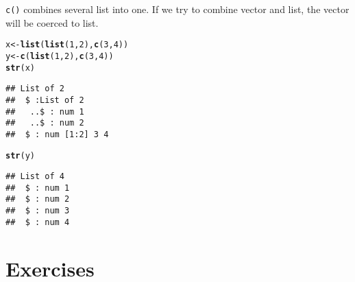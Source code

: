 \documentclass{article}\usepackage[]{graphicx}\usepackage[]{color}
\makeatletter
\newcommand{\hlnum}[1]{\textcolor[rgb]{0.686,0.059,0.569}{#1}}%
\newcommand{\hlstd}[1]{\textcolor[rgb]{0.345,0.345,0.345}{#1}}%
\newcommand{\hlkwb}[1]{\textcolor[rgb]{0.69,0.353,0.396}{#1}}%
\newcommand{\hlkwd}[1]{\textcolor[rgb]{0.737,0.353,0.396}{\textbf{#1}}}%
\newenvironment{kframe}{%
 \def\at@end@of@kframe{}%
 \ifinner\ifhmode%
  \def\at@end@of@kframe{\end{minipage}}%
  \begin{minipage}{\columnwidth}%
 \fi\fi%
 \def\FrameCommand##1{\hskip\@totalleftmargin \hskip-\fboxsep
 \colorbox{shadecolor}{##1}\hskip-\fboxsep
     \hskip-\linewidth \hskip-\@totalleftmargin \hskip\columnwidth}%
 \MakeFramed {\advance\hsize-\width
   \@totalleftmargin\z@ \linewidth\hsize
   \@setminipage}}%
 {\par\unskip\endMakeFramed%
 \at@end@of@kframe}
\newenvironment{knitrout}{}{} %
\makeatother
\begin{document}
\verb`c()` combines several list into one. If we try to combine vector and list, the vector will be coerced to list.

\begin{knitrout}
\color{fgcolor}\begin{kframe}
\begin{alltt}
\hlstd{x} \hlkwb{<-} \hlkwd{list}\hlstd{(}\hlkwd{list}\hlstd{(}\hlnum{1}\hlstd{,} \hlnum{2}\hlstd{),} \hlkwd{c}\hlstd{(}\hlnum{3}\hlstd{,} \hlnum{4}\hlstd{))}
\hlstd{y} \hlkwb{<-} \hlkwd{c}\hlstd{(}\hlkwd{list}\hlstd{(}\hlnum{1}\hlstd{,} \hlnum{2}\hlstd{),} \hlkwd{c}\hlstd{(}\hlnum{3}\hlstd{,} \hlnum{4}\hlstd{))}
\hlkwd{str}\hlstd{(x)}
\end{alltt}
\begin{verbatim}
## List of 2
##  $ :List of 2
##   ..$ : num 1
##   ..$ : num 2
##  $ : num [1:2] 3 4
\end{verbatim}
\begin{alltt}
\hlkwd{str}\hlstd{(y)}
\end{alltt}
\begin{verbatim}
## List of 4
##  $ : num 1
##  $ : num 2
##  $ : num 3
##  $ : num 4
\end{verbatim}
\end{kframe}
\end{knitrout}

\section{Exercises}
\end{document}
